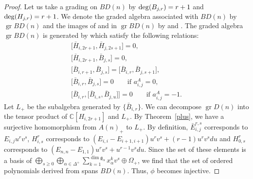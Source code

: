 \documentclass[10pt,a4paper]{amsart}
\numberwithin{equation}{section}
\theoremstyle{definition}
\begin{document}
\begin{proof}
Let us take a grading on $BD(n)$ by ${\rm deg}(B_{j,r})=r+1$ and ${\rm deg}(H_{j,r})=r+1$. We denote the graded algebra associated with $BD(n)$ by $\operatorname{gr}BD(n)$ and the images of  and  in $\operatorname{gr}BD(n)$ by  and . The graded algebra $\operatorname{gr}BD(n)$ is generated by  which satisfy the following relations:
\begin{gather*}
\bigl[\bar{H}_{i,2r+1},\bar{H}_{j,2s+1}\bigr]=0,\\
\bigl[\bar{H}_{i,2r+1},\bar{B}_{j,s}\bigr]=0,\\
\bigl[\bar{B}_{i,r+1},\bar{B}_{j,s}\bigr]=\bigl[\bar{B}_{i,r},\bar{B}_{j,s+1}\bigr],\\
\bigl[\bar{B}_{i,r},\bar{B}_{j,s}\bigr]=0\qquad \text{if }a^A_{i,j}=0,\\
\bigl[\bar{B}_{i,r},\bigl[\bar{B}_{i,s},\bar{B}_{j,u}\bigr]\bigr]=0\qquad \text{if }a^A_{i,j}=-1.
\end{gather*}
Let $L_+$ be the subalgebra generated by $\bigl\{\bar{B}_{i,r}\bigr\}$.
We can decompose $\operatorname{gr}D(n)$ into the tensor product of $\mathbb{C}[H_{i,2r+1}]$ and $L_+$. By Theorem~\ref{plus}, we have a surjective homomorphism from $A(n)_+$ to $L_+$.
By definition, $\bar{E}^{r,s}_{i,j}$ corresponds to $E_{i,j}u^rv^s$, $H^r_{i,s}$ corresponds to $(E_{i,i}-E_{i+1,i+1})u^rv^s+\allowbreak {(r-1)u^rv^sdu}$ and $H^r_{0,s}$ corresponds to $(E_{n,n}-E_{1,1})u^rv^s+u^{r-1}v^sdu$. Since the set of these elements is a basis of $\bigoplus_{s\geq0}\bigoplus_{\alpha\in\Delta^+}\sum_{k=1}^{\dim \mathfrak{g}_\alpha}x_\alpha^k v^s\oplus\Omega_+$, we find that the set of ordered polynomials derived from  spans $BD(n)$. Thus, $\phi$ becomes injective.
\end{proof}
\end{document}
